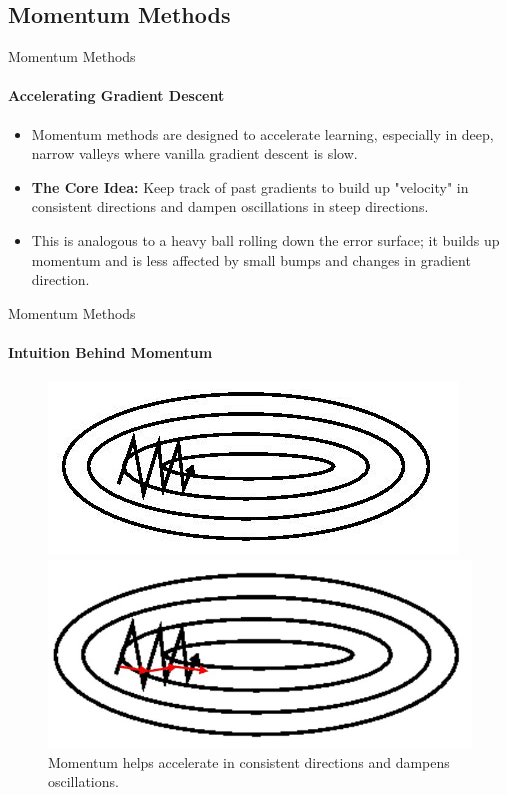 \subsection{Momentum Methods}

\begin{frame}{Momentum Methods}
    \framesubtitle{Accelerating Gradient Descent}
    \begin{itemize}
        \item Momentum methods are designed to accelerate learning, especially in deep, narrow valleys where vanilla gradient descent is slow.
        \item \textbf{The Core Idea:} Keep track of past gradients to build up "velocity" in consistent directions and dampen oscillations in steep directions.
        \item This is analogous to a heavy ball rolling down the error surface; it builds up momentum and is less affected by small bumps and changes in gradient direction.
    \end{itemize}

\end{frame}

\begin{frame}{Momentum Methods}
    \framesubtitle{Intuition Behind Momentum}
    \begin{figure}
        \centering
        \begin{minipage}{0.5\textwidth}
            \centering
            \includegraphics[width=\textwidth]{images/before_momentum.jpeg}
        \end{minipage}%
            \begin{minipage}{0.5\textwidth}
            \centering
            \includegraphics[width=\textwidth]{images/after_momentum.jpg}
        \end{minipage}
        \caption*{Momentum helps accelerate in consistent directions and dampens oscillations.}
    \end{figure}
\end{frame}

